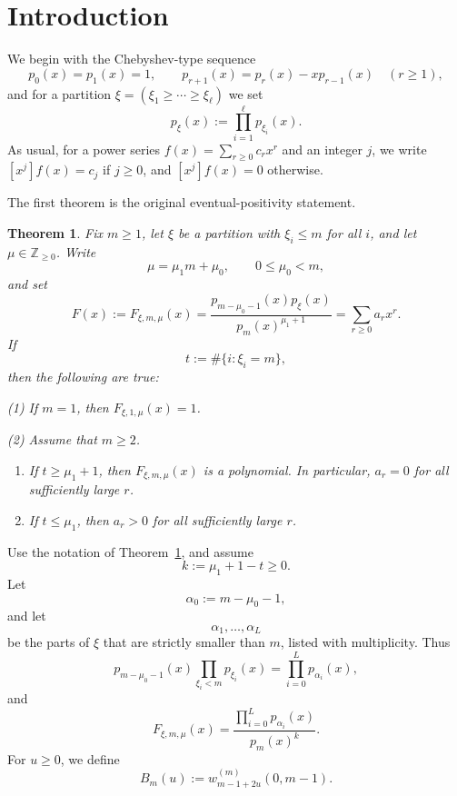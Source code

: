 \documentclass[12pt]{amsart}
\newtheorem{theorem}{Theorem}
\theoremstyle{definition}
\theoremstyle{remark}
\begin{document}
\section{Introduction}

We begin with the Chebyshev-type sequence
\[
p_0(x)=p_1(x)=1,\qquad p_{r+1}(x)=p_r(x)-x p_{r-1}(x)\quad (r\ge 1),
\]
and for a partition $\xi=(\xi_1\ge \cdots \ge \xi_\ell)$ we set
\begin{equation}
p_\xi(x):=\prod_{i=1}^\ell p_{\xi_i}(x).
\end{equation}
As usual, for a power series $f(x)=\sum_{r\ge 0} c_rx^r$ and an integer $j$, we write
$[x^j]f(x)=c_j$ if $j\ge 0$, and $[x^j]f(x)=0$ otherwise.

The first theorem is the original eventual-positivity statement.

\begin{theorem}\label{thm:main}
Fix $m\ge 1$, let $\xi$ be a partition with $\xi_i\le m$ for all $i$, and let
$\mu\in\mathbb Z_{\ge 0}$. Write
\[
\mu=\mu_1m+\mu_0,\qquad 0\le \mu_0<m,
\]
and set
\[
F(x):=F_{\xi,m,\mu}(x)=\frac{p_{m-\mu_0-1}(x)p_\xi(x)}{p_m(x)^{\mu_1+1}}=\sum_{r\ge 0}a_rx^r.
\]
If
\[
t:=\#\{i: \xi_i=m\},
\]
then the following are true:
\smallskip

\noindent
(1) If $m=1$, then $F_{\xi,1,\mu}(x)=1$.

\noindent
(2) Assume that $m\ge 2$.
  \begin{enumerate}
  \item[{\rm {(a)}}] If $t\ge \mu_1+1$, then $F_{\xi,m,\mu}(x)$ is a polynomial. In particular,
  $a_r=0$ for all sufficiently large $r$.
  \item[{\rm {(b)}}] If $t\le \mu_1$, then $a_r>0$ for all sufficiently large $r$.
  \end{enumerate}
\end{theorem}

Use the notation of Theorem~\ref{thm:main}, and assume
\[
k:=\mu_1+1-t\ge 0.
\]
Let
\[
\alpha_0:=m-\mu_0-1,
\]
and let
\[
\alpha_1,\dots,\alpha_L
\]
be the parts of $\xi$ that are strictly smaller than $m$, listed with multiplicity. Thus
\[
p_{m-\mu_0-1}(x)\prod_{\xi_i<m}p_{\xi_i}(x)=\prod_{i=0}^L p_{\alpha_i}(x),
\]
and
\[
F_{\xi,m,\mu}(x)=\frac{\prod_{i=0}^L p_{\alpha_i}(x)}{p_m(x)^k}.
\]
For $u\ge 0$, we define
\[
B_m(u):=w_{m-1+2u}^{(m)}(0,m-1).
\]
\end{document}

